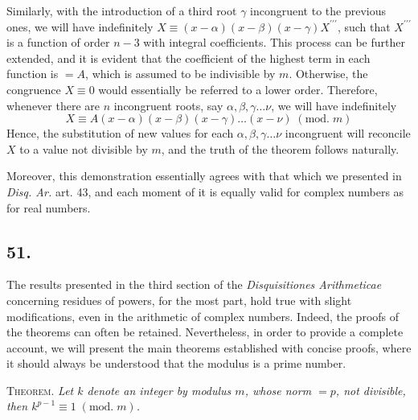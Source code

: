 \documentclass[twoside,12pt, showframe]{memoir}
\renewcommand{\pmod}[1]{\;(\textrm{mod.}\;#1)}
\begin{document}
Similarly, with the introduction of a third root \(\gamma\) incongruent to the previous ones, we will have indefinitely \(X \equiv(x-\alpha)(x-\beta)(x-\gamma) X^{\prime \prime \prime}\), such that \(X^{\prime \prime \prime}\) is a function of order \(n-3\) with integral coefficients. This process can be further extended, and it is evident that the coefficient of the highest term in each function is \(=A\), which is assumed to be indivisible by \(m\). Otherwise, the congruence \(X \equiv 0\) would essentially be referred to a lower order. Therefore, whenever there are \(n\) incongruent roots, say \(\alpha, \beta, \gamma \ldots \nu\), we will have indefinitely
\[X \equiv A(x-\alpha)(x-\beta)(x-\gamma) \ldots(x-\nu)\pmod{m}\]
Hence, the substitution of new values for each \(\alpha, \beta, \gamma \ldots \nu\) incongruent will reconcile \(X\) to a value not divisible by \(m\), and the truth of the theorem follows naturally.

Moreover, this demonstration essentially agrees with that which we presented in \textit{Disq. Ar.} art. 43, and each moment of it is equally valid for complex numbers as for real numbers.
%

\subsection*{51.}

The results presented in the third section of the \textit{Disquisitiones Arithmeticae} concerning residues of powers, for the most part, hold true with slight modifications, even in the arithmetic of complex numbers. Indeed, the proofs of the theorems can often be retained. Nevertheless, in order to provide a complete account, we will present the main theorems established with concise proofs, where it should always be understood that the modulus is a prime number.
%

\textsc{Theorem.} \textit{Let \(k\) denote an integer by modulus \(m\), whose norm \(=p\), not divisible, then \(k^{p-1} \equiv 1 \pmod{m}\).}
 
\end{document}
